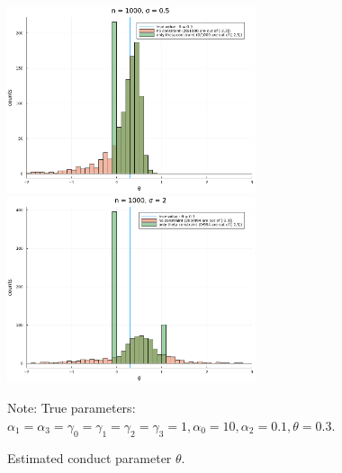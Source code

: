 \documentclass[11pt, a4paper]{article}
\begin{document}
\begin{figure}[!htbp]
  \begin{center}
  \includegraphics[width = 0.65\textwidth]
  {figuretable/histogram_loglinear_loglinear_n_1000_sigma_0.5.pdf}\\
  \includegraphics[width = 0.65\textwidth]
  {figuretable/histogram_loglinear_loglinear_n_1000_sigma_2.pdf}
  \caption{Estimated conduct parameter $\theta$.}
  \label{fg:histogram_loglinear_loglinear_n_1000_sigma_2} 
  \end{center}
  \footnotesize
  Note: True parameters: $\alpha_1 = \alpha_3 = \gamma_0 = \gamma_1 = \gamma_2  = \gamma_3 = 1, \alpha_0 = 10, \alpha_2 = 0.1,  \theta = 0.3.$
\end{figure} 
\end{document}
